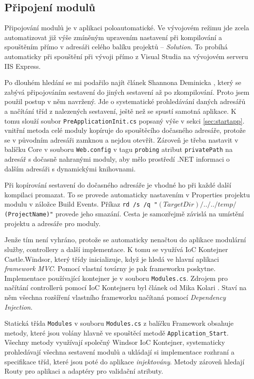 \documentclass[11pt,twoside,a4paper]{book}
\begin{document}
\subsection{Připojení modulů}
\label{subsec:pripojenimodulu}

Připojování modulů je v aplikaci poloautomatické. Ve vývojovém režimu jde zcela automatizovat již výše zmíněným upravením nastavení při kompilování a spouštěním přímo v adresáři celého balíku projektů -- \textit{Solution}. To probíhá automaticky při spouštění při vývoji přímo z Visual Studia na vývojovém serveru IIS Express.

Po dlouhém hledání se mi podařilo najít článek Shannona Deminicka \cite{Shazwazza}, který se zabývá připojováním sestavení do jiných sestavení až po zkompilování. Proto jsem použil postup v něm navržený. Jde o systematické prohledávání daných adresářů a načítání tříd z nalezených sestavení, ještě než se spustí samotná aplikace. K tomu slouží soubor \texttt{PreApplicationInit.cs} popsaný výše v sekci \ref{sec:startapp}. vnitřní metoda celé moduly kopíruje do spouštěcího dočasného adresáře, protože se v původním adresáři zamknou a nejdou otevřít. Zároveň je třeba nastavit v balíčku \textsf{Core} v souboru \texttt{Web.config} v tagu \texttt{probing} atribut \texttt{privatePath} na adresář s dočasně nahranými moduly, aby mělo prostředí .NET informaci o dalším adresáři s dynamickými knihovnami.

Při kopírování sestavení do dočasného adresáře je vhodné ho při každé další kompilaci promazat. To se provede automaticky nastavením v Properties projektu modulu v záložce Build Events. Příkaz \texttt{rd /s /q "$(TargetDir)/../../temp/$(ProjectName)"} provede jeho smazání. Cesta je samozřejmě závislá na umístění projektu a adresáře pro moduly.

Jenže tím není vyhráno, protože se automaticky nenačtou do aplikace modulární služby, controllery a další implementace. K tomu se využívá IoC Kontejner \textsf{Castle.Windsor}, který třídy inicializuje, když je hledá ve hlavní aplikaci \textit{framework MVC}. Pomocí vlastní továrny je pak frameworku poskytne. Implementace používající kontejner je v souboru \texttt{Modules.cs}. Zdrojem pro načítání controllerů pomocí IoC Kontejneru byl článek od Mika Kolari \cite{kolari}. Staví na něm všechna rozšíření vlastního frameworku načítaná pomocí \textit{Dependency Injection}.

Statická třída \texttt{Modules} v souboru \texttt{Modules.cs} z balíčku \textsf{Framework} obsahuje metody, které jsou volány hlavně ve spouštěcí metodě \texttt{Application\_Start}. Všechny metody využívají společný Windsor IoC Kontejner, systematicky prohledávají všechna sestavení modulů a ukládají si implementace rozhraní a specifikace tříd, které jsou poté do aplikace \textit{injektovány}.
Metody zároveň hledají Routy pro aplikaci a adaptéry pro validační atributy.
\end{document}

